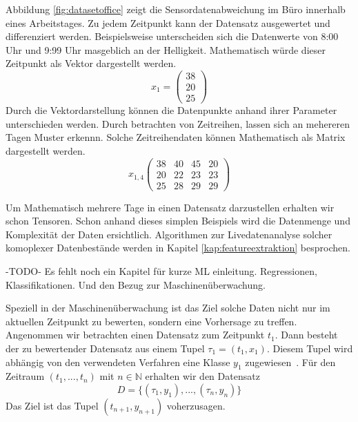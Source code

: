 Abbildung \ref{fig:datasetoffice} zeigt die Sensordatenabweichung im Büro innerhalb eines Arbeitstages. 
Zu jedem Zeitpunkt kann der Datensatz ausgewertet und differenziert werden. 
Beispielsweise unterscheiden sich die Datenwerte von 8:00 Uhr und 9:99 Uhr masgeblich an der Helligkeit. 
Mathematisch würde dieser Zeitpunkt als Vektor dargestellt werden.
\begin{equation}
  x_1 =
\begin{pmatrix}
    38\\
    20\\
    25 
\end{pmatrix}
\end{equation}
Durch die Vektordarstellung können die Datenpunkte anhand ihrer Parameter unterschieden werden. Durch betrachten von Zeitreihen, lassen sich an mehereren Tagen Muster erkennn. Solche Zeitreihendaten können Mathematisch als Matrix dargestellt werden.
\begin{equation}
  x_{1,4}
  \begin{pmatrix}
      38 & 40 & 45 & 20\\
      20 & 22 & 23 & 23\\
      25 & 28 & 29 & 29
  \end{pmatrix}
\end{equation}

Um Mathematisch mehrere Tage in einen Datensatz darzustellen erhalten wir schon Tensoren.
Schon anhand dieses simplen Beispiels wird die Datenmenge und Komplexität der Daten ersichtlich.
Algorithmen zur Livedatenanalyse solcher komoplexer Datenbestände werden in Kapitel \ref{kap:featureextraktion} besprochen.

\begin{center}
  -TODO- Es fehlt noch ein Kapitel für kurze ML einleitung. Regressionen, Klassifikationen. Und den Bezug zur Maschinenüberwachung. 
\end{center}

Speziell in der Maschinenüberwachung ist das Ziel solche Daten nicht nur im aktuellen Zeitpunkt zu bewerten, sondern eine Vorhersage zu treffen. Angenommen wir betrachten einen Datensatz zum Zeitpunkt $t_1$. Dann besteht der zu bewertender Datensatz aus einem Tupel $\tau_1=(t_1,x_1)$. Diesem Tupel wird abhängig von den verwendeten Verfahren eine Klasse $y_1$ zugewiesen~\cite{gay2013feature}. Für den Zeitraum $(t_1,...,t_n)$ mit $n \in \mathbb{N}$ erhalten wir den Datensatz 
\begin{equation}
  D=\{ (\tau_1,y_1), ... , (\tau_n,y_n) \}
  \label{equ:trainingset}
\end{equation}
Das Ziel ist das Tupel $(t_{n+1},y_{n+1})$ voherzusagen.

